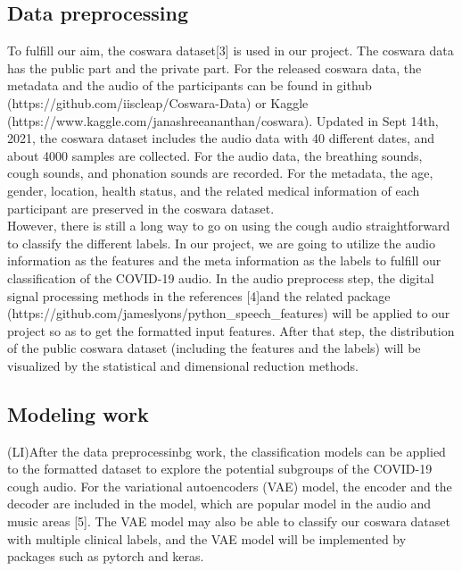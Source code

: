 \documentclass[11pt]{article}
\begin{document}
\subsection{Data preprocessing}
To fulfill our aim, the coswara dataset[3] is used in our project. The coswara data has the public 
part and the private part. For the released coswara data, the metadata and the audio of the 
participants can be found in github (https://github.com/iiscleap/Coswara-Data) or Kaggle 
(https://www.kaggle.com/janashreeananthan/coswara). Updated in Sept 14th, 2021, the coswara 
dataset includes the audio data with 40 different dates, and about 4000 samples are collected. 
For the audio data, the breathing sounds, cough sounds, and phonation sounds are recorded. 
For the metadata, the age, gender, location, health status, and the related medical information 
of each participant are preserved in the coswara dataset.\\

\noindent
However, there is still a long way to go on using the cough audio straightforward to classify 
the different labels. In our project, we are going to utilize the audio information as the 
features and the meta information as the labels to fulfill our classification of the COVID-19 
audio. In the audio preprocess step, the digital signal processing methods in the references 
[4]and the related package (https://github.com/jameslyons/python\_speech\_features) will be 
applied to our project so as to get the formatted input features. After that step, the distribution 
of the public coswara dataset (including the features and the labels) will be visualized by the 
statistical and dimensional reduction methods.  \\
 
\subsection{Modeling work}
(LI)After the data preprocessinbg work, the classification models can be applied to the formatted 
dataset to explore the potential subgroups of the COVID-19 cough audio. For the variational autoencoders (VAE) model, 
the encoder and the decoder are included in the model, which are popular model in the audio and 
music areas [5]. The VAE model may also be able to classify our coswara dataset with multiple 
clinical labels, and the VAE model will be implemented by packages such as pytorch and keras.\\
\end{document}
